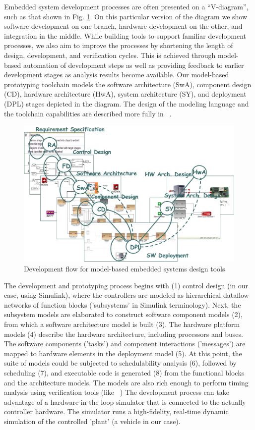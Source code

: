 Embedded system development processes are often presented on a ``V-diagram'', such as that shown in Fig. \ref{fig:vdiagram}. On this particular version of the diagram we show software development on one branch, hardware development on the other, and integration in the middle. While building tools to support familiar development processes, we also aim to improve the processes by shortening the length of design, development, and verification cycles.  This is achieved through model-based automation of development steps as well as providing feedback to earlier development stages as analysis results become available.  Our model-based prototyping toolchain models the software architecture (SwA), component design (CD), hardware architecture (HwA), system architecture (SY), and deployment (DPL) stages depicted in the diagram. The design of the modeling language and the toolchain capabilities are described more fully in ~\cite{aces08}.  

\begin{figure}[ht]
\centering
\includegraphics[width=\columnwidth]{figures/dev_diagram.jpg}
    \caption{Development flow for model-based embedded systems design tools}
    \label{fig:vdiagram}
\end{figure}

The development and prototyping process begins with (1) control design (in our case, using Simulink), where the controllers are modeled as hierarchical dataflow networks of function blocks ('subsystems' in Simulink terminology). Next, the subsystem models are elaborated to construct software component models (2), from which a software architecture model is built (3). The hardware platform models (4) describe the hardware architecture, including processors and buses. The software components ('tasks') and component interactions ('messages') are mapped to hardware elements in the deployment model (5). At this point, the suite of models could be subjected to schedulability analysis (6), followed by scheduling (7), and executable code is generated (8) from the functional blocks and the architecture models. The models are also rich enough to perform timing analysis using verification tools (like ~\cite{TrueTime}) The development process can take advantage of a hardware-in-the-loop simulator that is connected to the actually controller hardware. The simulator runs a high-fidelity, real-time dynamic simulation of the controlled 'plant' (a vehicle in our case). 

